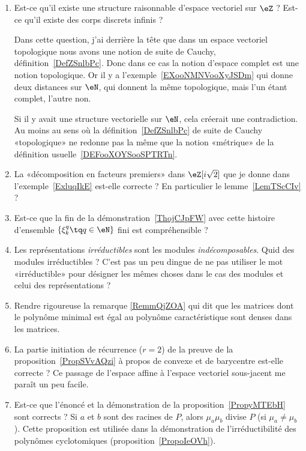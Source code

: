\begin{enumerate}
    \item
        Est-ce qu'il existe une structure raisonnable d'espace vectoriel sur \( \eZ\) ? Est-ce qu'il existe des corps discrets infinis ?

        Dans cette question, j'ai derrière la tête que dans un espace vectoriel topologique nous avons une notion de suite de Cauchy, définition~\ref{DefZSnlbPc}. Donc dans ce cas la notion d'espace complet est une notion topologique. Or il y a l'exemple~\ref{EXooNMNVooXyJSDm} qui donne deux distances sur \( \eN\), qui donnent la même topologique, mais l'un étant complet, l'autre non.

        Si il y avait une structure vectorielle sur \( \eN\), cela créerait une contradiction. Au moins au sens où la définition~\ref{DefZSnlbPc} de suite de Cauchy «topologique» ne redonne pas la même que la notion «métrique» de la définition usuelle~\ref{DEFooXOYSooSPTRTn}.
    \item
        La «décomposition en facteurs premiers» dans \( \eZ[i\sqrt{2}]\) que je donne dans l'exemple~\ref{ExluqIkE} est-elle correcte ? En particulier le lemme~\ref{LemTScCIv} ?
    \item
        Est-ce que la fin de la démonstration~\ref{ThojCJpFW} avec cette histoire d'ensemble \( \{ \xi_k^q\tq q\in \eN \}\) fini est compréhensible ?
    \item
        Les représentations \emph{irréductibles} sont les modules \emph{indécomposables}. Quid des modules irréductibles ? C'est pas un peu dingue de ne pas utiliser le mot «irréductible» pour désigner les mêmes choses dans le cas des modules et celui des représentations ?
    \item
        Rendre rigoureuse la remarque \eqref{RemmQjZOA} qui dit que les matrices dont le polynôme minimal est égal au polynôme caractéristique sont denses dans les matrices.
    \item
        La partie initiation de récurrence (\( r=2\)) de la preuve de la proposition~\ref{PropSVvAQzi} à propos de convexe et de barycentre est-elle correcte ? Ce passage de l'espace affine à l'espace vectoriel sous-jacent me paraît un peu facile.
    \item
        Est-ce que l'énoncé et la démonstration de la proposition~\ref{PropyMTEbH} sont corrects ? Si \( a\) et \( b\) sont des racines de \( P\), alors \( \mu_a\mu_b\) divise \( P\) (si \( \mu_a\neq \mu_b\)). Cette proposition est utilisée dans la démonstration de l'irréductibilité des polynômes cyclotomiques (proposition~\ref{PropoIeOVh}).

\end{enumerate}
